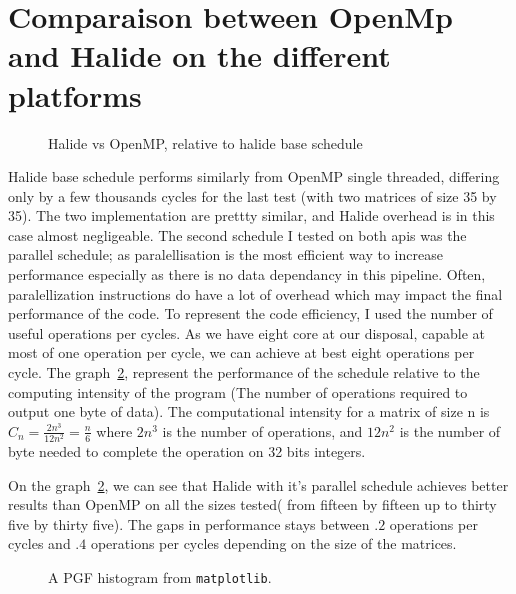\section{Comparaison between OpenMp and Halide on the different platforms}

\begin{figure}
	    \captionsetup{skip=1cm}
        
    \caption{Halide vs OpenMP, relative to halide base schedule}
	\label{fig:barPlot}
\end{figure}
	Halide base schedule performs similarly from OpenMP single threaded, differing only by a few thousands cycles for the last test (with two matrices of size 35 by 35). The two implementation are prettty similar, and Halide overhead is in this case almost negligeable. The second schedule I tested on both \glspl{api} was the parallel schedule; as paralellisation is the most efficient way to increase performance especially as there is no data dependancy in this pipeline. Often, paralellization instructions do have a lot of overhead which may impact the final performance of the code. To represent  the code efficiency, I used the number of useful operations per cycles. As we have eight core at our disposal, capable at most of one operation per cycle, we can achieve at best eight operations per cycle. The graph~\ref{fig:roofline}, represent the performance of the schedule relative to the computing intensity of the program (The number of operations required to output one byte of data). The computational intensity for a matrix of size n is $C_n = \frac{2n^3}{12n^2} = \frac{n}{6}$ where $2n^3$ is the number of operations, and $12n^2$ is the number of byte needed to complete the operation on 32 bits integers.

	On the  graph~\ref{fig:roofline}, we can see that Halide with it's parallel schedule achieves better results than OpenMP on all the sizes tested( from fifteen by fifteen up to thirty five by thirty five). The gaps in performance stays between $.2$ operations per cycles and $.4$ operations per cycles depending on the size of the matrices.




\begin{figure}
	
    \caption{A PGF histogram from \texttt{matplotlib}.}
	\label{fig:roofline}
\end{figure}

